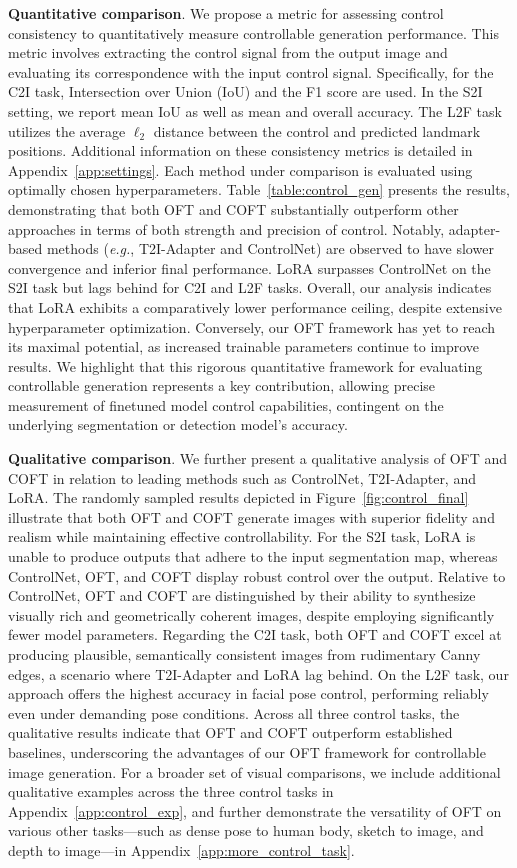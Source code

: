 \textbf{Quantitative comparison}. We propose a metric for assessing control consistency to quantitatively measure controllable generation performance. This metric involves extracting the control signal from the output image and evaluating its correspondence with the input control signal. Specifically, for the C2I task, Intersection over Union (IoU) and the F1 score are used. In the S2I setting, we report mean IoU as well as mean and overall accuracy. The L2F task utilizes the average $\ell_2$ distance between the control and predicted landmark positions. Additional information on these consistency metrics is detailed in Appendix~\ref{app:settings}. Each method under comparison is evaluated using optimally chosen hyperparameters. Table~\ref{table:control_gen} presents the results, demonstrating that both OFT and COFT substantially outperform other approaches in terms of both strength and precision of control. Notably, adapter-based methods (\emph{e.g.}, T2I-Adapter and ControlNet) are observed to have slower convergence and inferior final performance. LoRA surpasses ControlNet on the S2I task but lags behind for C2I and L2F tasks. Overall, our analysis indicates that LoRA exhibits a comparatively lower performance ceiling, despite extensive hyperparameter optimization. Conversely, our OFT framework has yet to reach its maximal potential, as increased trainable parameters continue to improve results. We highlight that this rigorous quantitative framework for evaluating controllable generation represents a key contribution, allowing precise measurement of finetuned model control capabilities, contingent on the underlying segmentation or detection model’s accuracy.

\textbf{Qualitative comparison}. We further present a qualitative analysis of OFT and COFT in relation to leading methods such as ControlNet, T2I-Adapter, and LoRA. The randomly sampled results depicted in Figure~\ref{fig:control_final} illustrate that both OFT and COFT generate images with superior fidelity and realism while maintaining effective controllability. For the S2I task, LoRA is unable to produce outputs that adhere to the input segmentation map, whereas ControlNet, OFT, and COFT display robust control over the output. Relative to ControlNet, OFT and COFT are distinguished by their ability to synthesize visually rich and geometrically coherent images, despite employing significantly fewer model parameters. Regarding the C2I task, both OFT and COFT excel at producing plausible, semantically consistent images from rudimentary Canny edges, a scenario where T2I-Adapter and LoRA lag behind. On the L2F task, our approach offers the highest accuracy in facial pose control, performing reliably even under demanding pose conditions. Across all three control tasks, the qualitative results indicate that OFT and COFT outperform established baselines, underscoring the advantages of our OFT framework for controllable image generation. For a broader set of visual comparisons, we include additional qualitative examples across the three control tasks in Appendix~\ref{app:control_exp}, and further demonstrate the versatility of OFT on various other tasks—such as dense pose to human body, sketch to image, and depth to image—in Appendix~\ref{app:more_control_task}.

